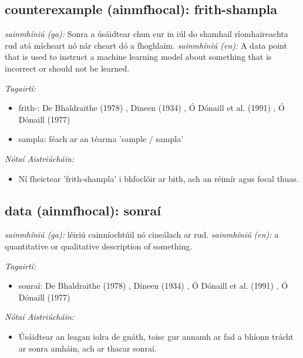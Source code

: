 \documentclass{article}
\begin{document}
\subsection*{counterexample (ainmfhocal): frith-shampla} 
 \noindent \textit{sainmhíniú (ga):} Sonra a úsáidtear chun cur in iúl do shamhail ríomhaireachta rud atá mícheart nó nár cheart dó a fhoghlaim.
\newline\newline
 \noindent \textit{sainmhíniú (en):} A data point that is used to instruct a machine learning model about something that is incorrect or should not be learned.
\newline

 \noindent \textit{Tagairtí:}
\begin{itemize}
	\item frith-: De Bhaldraithe (1978) \cite{de-bhaldraithe}, Dineen (1934) \cite{dineen}, Ó Dónaill et al. (1991) \cite{focloir-beag}, Ó Dónaill (1977) \cite{odonaill}
	\item sampla: féach ar an téarma 'sample / sampla'
\end{itemize}

 \noindent \textit{Nótaí Aistriúcháin:}
\begin{itemize}
	\item Ní fheictear 'frith-shampla' i bhfoclóir ar bith, ach an réimír agus focal thuas.
\end{itemize}


\subsection*{data (ainmfhocal): sonraí} 
 \noindent \textit{sainmhíniú (ga):} léiriú cainníochtúil nó cineálach ar rud.
\newline\newline
 \noindent \textit{sainmhíniú (en):} a quantitative or qualitative description of something.
\newline

 \noindent \textit{Tagairtí:}
\begin{itemize}
	\item sonraí: De Bhaldraithe (1978) \cite{de-bhaldraithe}, Dineen (1934) \cite{dineen}, Ó Dónaill et al. (1991) \cite{focloir-beag}, Ó Dónaill (1977) \cite{odonaill}
\end{itemize}

 \noindent \textit{Nótaí Aistriúcháin:}
\begin{itemize}
	\item Úsáidtear an leagan iolra de gnáth, toisc gur annamh ar fad a bhíonn trácht ar sonra amháin, ach ar thacar sonraí.
\end{itemize}
\end{document}
